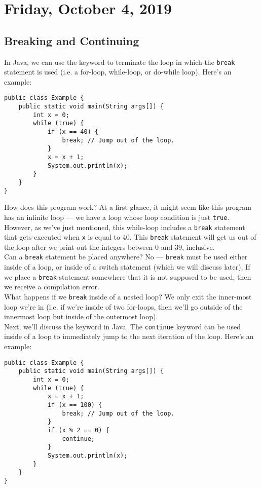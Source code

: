 \section{Friday, October 4, 2019}

\subsection{Breaking and Continuing}

In Java, we can use the  keyword to terminate the loop in which the \verb!break! statement is used (i.e. a for-loop, while-loop, or do-while loop). Here's an example:

\begin{lstlisting}
public class Example {
    public static void main(String args[]) {   
        int x = 0;
        while (true) {
            if (x == 40) {
                break; // Jump out of the loop.
            }
            x = x + 1;
            System.out.println(x);
        }
    }
}
\end{lstlisting}

How does this program work? At a first glance, it might seem like this program has an infinite loop --- we have a loop whose loop condition is just \verb!true!. However, as we've just mentioned, this while-loop includes a \verb!break! statement that gets executed when \verb!x! is equal to $40$. This \verb!break! statement will get us out of the loop after we print out the integers between $0$ and $39$, inclusive. \\

Can a \verb!break! statement be placed anywhere? No --- \verb!break! must be used either inside of a loop, or inside of a switch statement (which we will discuss later). If we place a \verb!break! statement somewhere that it is not supposed to be used, then we receive a compilation error. \\

What happens if we \verb!break! inside of a nested loop? We only exit the inner-most loop we're in (i.e. if we're inside of two for-loops, then we'll go outside of the innermost loop but inside of the outermost loop). \\

Next, we'll discuss the  keyword in Java. The \verb!continue! keyword can be used inside of a loop to immediately jump to the next iteration of the loop. Here's an example:


\begin{lstlisting}
public class Example {
    public static void main(String args[]) {   
        int x = 0;
        while (true) {
            x = x + 1;
            if (x == 100) {
                break; // Jump out of the loop.
            }
            if (x % 2 == 0) {
                continue;
            }
            System.out.println(x);
        }
    }
}
\end{lstlisting}

